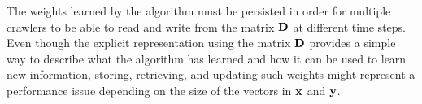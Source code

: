 The weights learned by the \mlblink algorithm must be persisted in order for multiple crawlers to be able to read and write from the matrix $\boldsymbol{\mathbf{D}}$ at different time steps. Even though the explicit representation using the matrix $\boldsymbol{\mathbf{D}}$ provides a simple way to describe what the algorithm has learned and how it can be used to learn new information, storing, retrieving, and updating such weights might represent a performance issue depending on the size of the vectors in $\boldsymbol{\mathbf{x}}$ and $\boldsymbol{\mathbf{y}}$.
